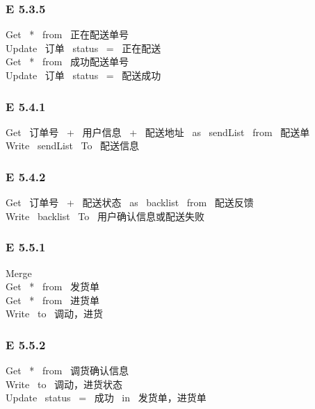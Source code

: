 \subsubsection*{E 5.3.5}
Get \ * \ from \ 正在配送单号 \\ 
Update \ 订单 \ status \ = \ 正在配送 \\ 
Get \ * \ from \ 成功配送单号 \\ 
Update \ 订单 \ status \ = \ 配送成功\\ 
\vspace{-1mm}
\subsubsection*{E 5.4.1}
Get \ 订单号 \ + \ 用户信息 \ + \ 配送地址 \ as \ sendList \ from \ 配送单 \\ 
Write \ sendList \ To \ 配送信息\\ 
\vspace{-1mm}
\subsubsection*{E 5.4.2}
Get \ 订单号 \ + \ 配送状态 \ as \ backlist \ from \ 配送反馈 \\ 
Write \ backlist \ To \ 用户确认信息或配送失败\\ 
\vspace{-1mm}
\subsubsection*{E 5.5.1}
Merge\\ 
Get \ * \ from \ 发货单 \\ 
Get \ * \ from \ 进货单 \\ 
Write \ to \ 调动，进货\\ 
\vspace{-1mm}
\subsubsection*{E 5.5.2}
Get \ * \ from \ 调货确认信息\\ 
Write \ to \ 调动，进货状态\\ 
Update \ status \ = \ 成功 \ in \ 发货单，进货单\\ 
\vspace{-1mm}